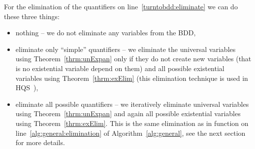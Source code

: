 \documentclass[
  digital, %
  color,
  twoside, %
  table,   %
  nolof,     %
  nolot,     %
]{fithesis3}
\theoremstyle{definition}
\theoremstyle{remark}
\begin{document}
For the elimination of the quantifiers on line~\ref{turntobdd:eliminate} we can do these three things:
\begin{itemize}
    \item nothing -- we do not eliminate any variables from the BDD,
    \item eliminate only ``simple'' quantifiers -- we eliminate the universal variables using Theorem~\ref{thrm:unExpan} only if they do not create new variables (that is no existential variable depend on them) and all possible existential variables using Theorem~\ref{thrm:exElim} (this elimination technique is used in HQS~\cite{HQSquantifierLocalisation}), %
    \item eliminate all possible quantifiers -- we iteratively eliminate universal variables using Theorem~\ref{thrm:unExpan} and again all possible existential variables using Theorem~\ref{thrm:exElim}. This is the same elimination as in function  on line~\ref{alg:general:elimination} of Algorithm~\ref{alg:general}, see the next section for more details. %
\end{itemize}
\end{document}
